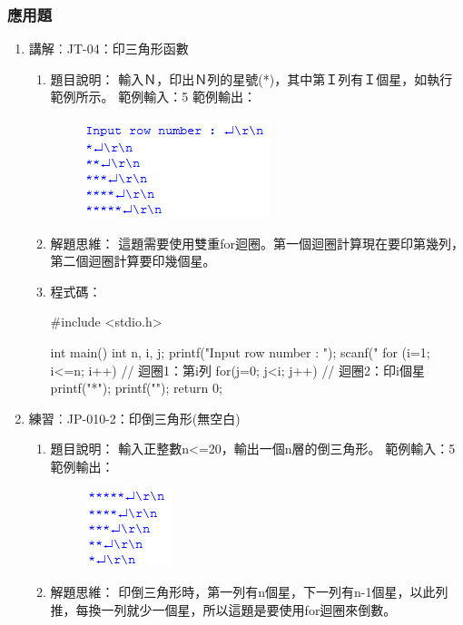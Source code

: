 \subsubsection {應用題}
\begin{enumerate}
	\item 講解︰JT-04：印三角形函數
		\begin{enumerate}
			\item 題目說明：
			\subitem 輸入Ｎ，印出Ｎ列的星號(*)，其中第Ｉ列有Ｉ個星，如執行範例所示。
			\subitem 範例輸入：5
			\subitem 範例輸出：
				\begin{figure}[H]
					\centering
					\includegraphics{fig/JT04fig}
				\end{figure}
			
			\item 解題思維：
			\subitem 
				這題需要使用雙重for迴圈。第一個迴圈計算現在要印第幾列，第二個迴圈計算要印幾個星。
			\item 程式碼：
			\begin{cppcode}
				#include <stdio.h>
				
				int main()
				{
					int n, i, j;
					printf("Input row number : \n");
					scanf("%
					for (i=1; i<=n; i++) { // 迴圈1：第i列
						for(j=0; j<i; j++) { // 迴圈2：印i個星
							printf("*");
						}
						printf("\n");
					}
					return 0;
				}
					
			\end{cppcode}
		\end{enumerate}

	\item 練習︰JP-010-2：印倒三角形(無空白)
		\begin{enumerate}
			\item 題目說明：
			\subitem 輸入正整數n<=20，輸出一個n層的倒三角形。
			\subitem 範例輸入：5
			\subitem 範例輸出：
			\begin{figure}[H]
				\centering
				\includegraphics{fig/JP010fig}
			\end{figure}
			\item 解題思維：
			\subitem 印倒三角形時，第一列有n個星，下一列有n-1個星，以此列推，每換一列就少一個星，所以這題是要使用for迴圈來倒數。

\end{enumerate}
\end{enumerate}
